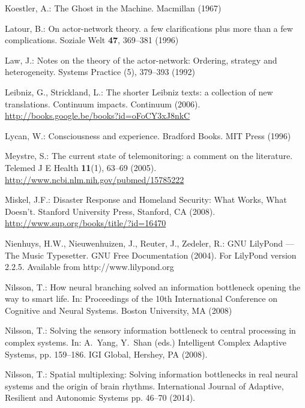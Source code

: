\documentclass[twocolumn]{svjour3}
\begin{document}
\begin{thebibliography}{10}
Koestler, A.: The Ghost in the Machine.
\newblock Macmillan (1967)

Latour, B.: On actor-network theory. a few clarifications plus more than a few
  complications.
\newblock Soziale Welt \textbf{47}, 369--381 (1996)

Law, J.: Notes on the theory of the actor-network: Ordering, strategy and
  heterogeneity.
\newblock Systems Practice (5), 379--393 (1992)

Leibniz, G., Strickland, L.: The shorter Leibniz texts: a collection of new
  translations.
\newblock Continuum impacts. Continuum (2006).
\newblock \urlprefix\url{http://books.google.be/books?id=oFoCY3xJ8nkC}

Lycan, W.: Consciousness and experience.
\newblock Bradford Books. MIT Press (1996)

Meystre, S.: The current state of telemonitoring: a comment on the literature.
\newblock Telemed J E Health \textbf{11}(1), 63--69 (2005).
\newblock \urlprefix\url{http://www.ncbi.nlm.nih.gov/pubmed/15785222}

Miskel, J.F.: Disaster Response and Homeland Security: What Works, What
  Doesn't.
\newblock Stanford University Press, Stanford, CA (2008).
\newblock \urlprefix\url{http://www.sup.org/books/title/?id=16470}

Nienhuys, H.W., Nieuwenhuizen, J., Reuter, J., Zedeler, R.: GNU LilyPond ---
  The Music Typesetter.
\newblock GNU Free Documentation (2004).
\newblock For LilyPond version 2.2.5. Available from http://www.lilypond.org

Nilsson, T.: How neural branching solved an information bottleneck opening the
  way to smart life.
\newblock In: Proceedings of the 10th International Conference on Cognitive and
  Neural Systems. Boston University, {MA} (2008)

Nilsson, T.: Solving the sensory information bottleneck to central processing
  in complex systems.
\newblock In: A.~Yang, Y.~Shan (eds.) Intelligent Complex Adaptive Systems, pp.
  159--186. IGI Global, Hershey, {PA} (2008).
\newblock {}

Nilsson, T.: Spatial multiplexing: Solving information bottlenecks in real
  neural systems and the origin of brain rhythms.
\newblock International Journal of Adaptive, Resilient and Autonomic Systems
  pp. 46--70 (2014).
\newblock {}


\end{thebibliography}
\end{document}
